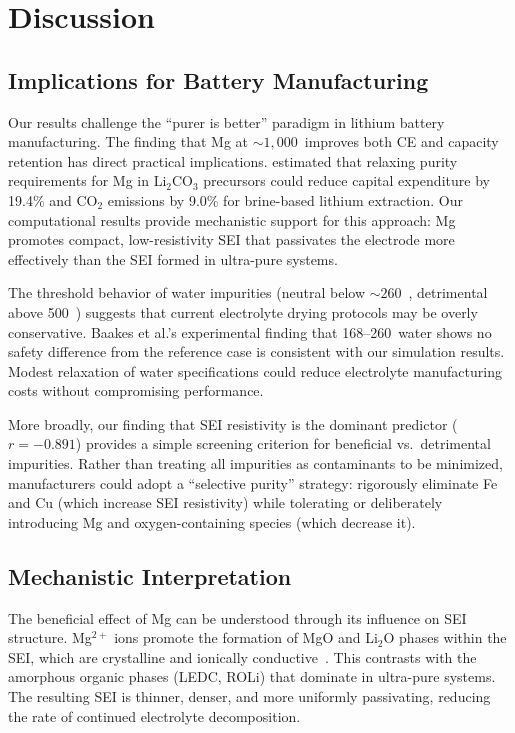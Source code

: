 \section{Discussion}
\label{sec:discussion}

\subsection{Implications for Battery Manufacturing}
\label{sec:implications}

Our results challenge the ``purer is better'' paradigm in lithium battery manufacturing. The finding that Mg at ${\sim}1{,}000$~\ppm improves both CE and capacity retention has direct practical implications. \citet{choe2024reevaluation} estimated that relaxing purity requirements for Mg in Li$_2$CO$_3$ precursors could reduce capital expenditure by 19.4\% and CO$_2$ emissions by 9.0\% for brine-based lithium extraction. Our computational results provide mechanistic support for this approach: Mg promotes compact, low-resistivity SEI that passivates the electrode more effectively than the SEI formed in ultra-pure systems.

The threshold behavior of water impurities (neutral below ${\sim}260$~\ppm, detrimental above 500~\ppm) suggests that current electrolyte drying protocols may be overly conservative. Baakes et al.'s experimental finding that 168--260~\ppm water shows no safety difference from the reference case is consistent with our simulation results. Modest relaxation of water specifications could reduce electrolyte manufacturing costs without compromising performance.

More broadly, our finding that SEI resistivity is the dominant predictor ($r=-0.891$) provides a simple screening criterion for beneficial vs.\ detrimental impurities. Rather than treating all impurities as contaminants to be minimized, manufacturers could adopt a ``selective purity'' strategy: rigorously eliminate Fe and Cu (which increase SEI resistivity) while tolerating or deliberately introducing Mg and oxygen-containing species (which decrease it).

\subsection{Mechanistic Interpretation}
\label{sec:mechanism}

The beneficial effect of Mg can be understood through its influence on SEI structure. Mg$^{2+}$ ions promote the formation of MgO and Li$_2$O phases within the SEI, which are crystalline and ionically conductive~\citep{choe2024reevaluation}. This contrasts with the amorphous organic phases (LEDC, ROLi) that dominate in ultra-pure systems. The resulting SEI is thinner, denser, and more uniformly passivating, reducing the rate of continued electrolyte decomposition.

